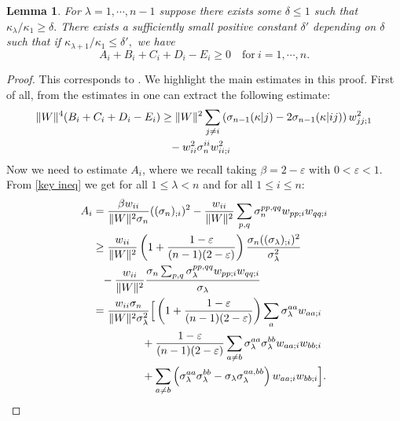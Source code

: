 \documentclass{amsart}
\newtheorem{lemma}[theorem]{Lemma}
\theoremstyle{definition}
\theoremstyle{remark}
\numberwithin{equation}{section}
\begin{document}
\begin{lemma}\label{app3}
For $\lambda=1,\cdots,n-1$ suppose there exists some $\delta\leq 1$ such that $\kappa_{\lambda}/\kappa_1\geq \delta.$ There exists a sufficiently small positive constant $\delta'$ depending on $\delta$ such that if $\kappa_{\lambda+1}/\kappa_1\leq \delta',$ we have
\[A_i+B_i+C_i+D_i-E_i\geq 0\quad \text{for}~i=1,\cdots,n.\]
\end{lemma}
\begin{proof}
This corresponds to \cite[Lemma~4.3]{Guan}. We highlight the main estimates in this proof. First of all, from the estimates in \cite[Lemma~4.2]{Guan} one can extract the following estimate:
\begin{align}\begin{split}\label{app3-1}
\|W\|^4(B_i+C_i+D_i-E_i)&\geq \|W\|^2\sum_{j\neq i} \left(\sigma_{n-1}(\kappa|j)-2\sigma_{n-1}(\kappa|ij)\right)w_{jj;1}^2\\
				&\hphantom{=}-w_{ii}^2\sigma_{n}^{ii}w_{ii;i}^2 
\end{split}\end{align}
Now we need to estimate $A_i$, where we recall taking $\beta=2-\varepsilon$ with $0<\varepsilon<1$. From \eqref{key ineq} we get for all $1\leq \lambda<n$ and for all $1\leq i\leq n\colon$
\begin{align}\begin{split}
A_i&=\frac{\beta w_{ii}}{\|W\|^2\sigma_n}((\sigma_n)_{;i})^2-\frac{w_{ii}}{\|W\|^2}\sum_{p,q}\sigma_n^{pp,qq}w_{pp;i}w_{qq;i}\\
		&\geq \frac{w_{ii}}{\|W\|^2}\left(1+\frac{1-\varepsilon}{(n-1)(2-\varepsilon)}\right)\frac{\sigma_n((\sigma_{\lambda})_{;i})^2}{\sigma_{\lambda}^2}\\
					&\hphantom{=}-\frac{w_{ii}}{\|W\|^2}\frac{\sigma_n\sum_{p,q}\sigma_{\lambda}^{pp,qq}w_{pp;i}w_{qq;i}}{\sigma_{\lambda}}\\
                    &=\frac{w_{ii}\sigma_n}{\|W\|^2\sigma_{\lambda}^2}\Big[\left(1+\frac{1-\varepsilon}{(n-1)(2-\varepsilon)}\right)\sum_{a}\sigma_{\lambda}^{aa}w_{aa;i}\\
                    	&\hphantom{\frac{w_{ii}\sigma_n}{\|W\|^2\sigma_{\lambda}^2}\Big(}+\frac{1-\varepsilon}{(n-1)(2-\varepsilon)}\sum_{a\neq b}\sigma_\lambda^{aa}\sigma_{\lambda}^{bb}w_{aa;i}w_{bb;i}\\
                        &\hphantom{\frac{w_{ii}\sigma_n}{\|W\|^2\sigma_{\lambda}^2}\Big(}+\sum_{a\neq b}\left(\sigma_{\lambda}^{aa}\sigma_{\lambda}^{bb}-\sigma_{\lambda}\sigma_{\lambda}^{aa,bb}\right)w_{aa;i}w_{bb;i}\Big].
\end{split}\end{align}


\end{proof}
\end{document}

